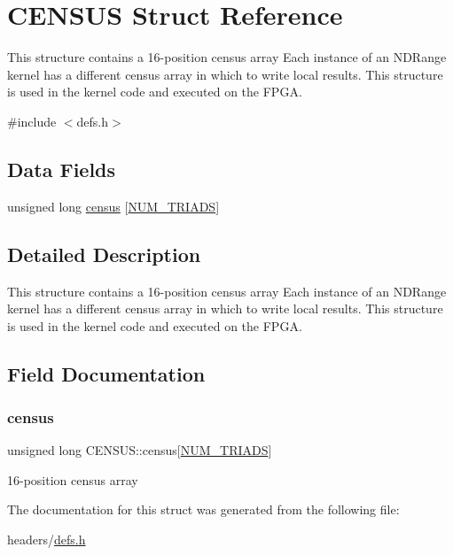 \hypertarget{structCENSUS}{}\section{C\+E\+N\+S\+US Struct Reference}
\label{structCENSUS}


This structure contains a 16-\/position census array Each instance of an N\+D\+Range kernel has a different census array in which to write local results. This structure is used in the kernel code and executed on the F\+P\+GA.  




{\ttfamily \#include $<$defs.\+h$>$}

\subsection*{Data Fields}
\begin{DoxyCompactItemize}
\item 
unsigned long \hyperlink{structCENSUS_af453f5988e48ea730fb00d12db40984a}{census} \mbox{[}\hyperlink{utils_8h_ab2bde72626290c6daf5da1e9517aa8fb}{N\+U\+M\+\_\+\+T\+R\+I\+A\+DS}\mbox{]}
\end{DoxyCompactItemize}


\subsection{Detailed Description}
This structure contains a 16-\/position census array Each instance of an N\+D\+Range kernel has a different census array in which to write local results. This structure is used in the kernel code and executed on the F\+P\+GA. 

\subsection{Field Documentation}
\mbox{\label{structCENSUS_af453f5988e48ea730fb00d12db40984a}} 
\subsubsection{\texorpdfstring{census}{census}}
{\footnotesize\ttfamily unsigned long C\+E\+N\+S\+U\+S\+::census\mbox{[}\hyperlink{utils_8h_ab2bde72626290c6daf5da1e9517aa8fb}{N\+U\+M\+\_\+\+T\+R\+I\+A\+DS}\mbox{]}}

16-\/position census array 

The documentation for this struct was generated from the following file\+:\begin{DoxyCompactItemize}
\item 
headers/\hyperlink{defs_8h}{defs.\+h}\end{DoxyCompactItemize}
